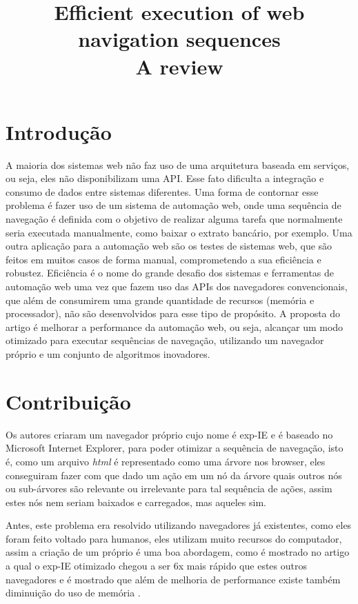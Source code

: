 \documentclass[conference]{IEEEtran}
\title{Efficient execution of web navigation sequences \cite{art:main}
  \\ A review}
\author{
  \IEEEauthorblockA{Universidade Federal de Alagoas -- Instituto de Computação
    \\ Professor: André Lage Freitas -- Matéria: Sistema Distribuídos}
  \IEEEauthorblockN{Revisado por: \textbf{Bruno da Silva Belo} (12110981)
    e \textbf{Iago Barbosa de Souza} (14210353) em 2016-08-13}
}
\begin{document}
\maketitle

\section{Introdução}
\label{sec:intro}
A maioria dos sistemas web não faz uso de uma arquitetura baseada em serviços, 
ou seja, eles não disponibilizam uma API. Esse fato dificulta a integração e consumo 
de dados entre sistemas diferentes.
Uma forma de contornar esse problema é fazer uso de um sistema de automação web, onde
uma sequência de navegação é definida com o objetivo de realizar alguma tarefa que
normalmente seria executada manualmente, como baixar o extrato bancário, por exemplo.  
Uma outra aplicação para a automação web são os testes de sistemas web, que são feitos
em muitos casos de forma manual, comprometendo a sua eficiência e robustez.
Eficiência é o nome do grande desafio dos sistemas e ferramentas de automação web 
uma vez que fazem uso das APIs dos navegadores convencionais, que além de consumirem 
uma grande quantidade de recursos (memória e processador), não são desenvolvidos
para esse tipo de propósito.
A proposta do artigo é melhorar a performance da automação web, ou seja, 
alcançar um modo otimizado para executar sequências de navegação, utilizando um navegador
próprio e um conjunto de algoritmos inovadores.
\section{Contribuição}
\label{sec:contrib}
Os autores criaram um navegador próprio cujo nome é exp-IE e é baseado no
Microsoft Internet Explorer,  para poder otimizar a sequência de navegação, isto
é, como um arquivo \emph{html} é representado como uma árvore nos browser, eles
conseguiram fazer com que dado um ação em um nó da árvore quais outros nós ou
sub-árvores são relevante ou irrelevante para tal sequência de ações, assim
estes nós nem seriam baixados e carregados, mas aqueles sim.

Antes, este problema era resolvido utilizando navegadores já existentes, como
eles foram feito voltado para humanos, eles utilizam muito recursos do
computador, assim a criação de um próprio é uma boa abordagem, como é mostrado
no artigo a qual o exp-IE otimizado chegou a ser 6x mais rápido que estes outros
navegadores e é mostrado que além de melhoria de performance existe também
diminuição do uso de memória .
\end{document}
